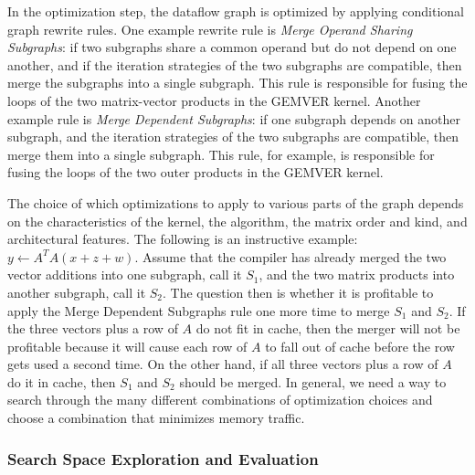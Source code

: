 \documentclass[11pt]{article}
\begin{document}
In the optimization step, the dataflow graph is optimized by applying conditional graph rewrite rules.  One example rewrite rule is \emph{Merge Operand Sharing Subgraphs}: if two subgraphs share a common operand but do not depend on one another, and if the iteration strategies of the two subgraphs are compatible, then merge the subgraphs into a single subgraph.  This rule is responsible for fusing the loops of the two matrix-vector products in the GEMVER kernel.  Another example rule is \emph{Merge Dependent Subgraphs}: if one subgraph depends on another subgraph, and the iteration strategies of the two subgraphs are compatible, then merge them into a single subgraph.  This rule, for example, is responsible for fusing the loops of the two outer products in the GEMVER kernel.

The choice of which optimizations to apply to various parts of the graph depends on the characteristics of the kernel, the algorithm, the matrix order and kind, and architectural features.  The following is an instructive example: $y \gets A^T A (x + z + w)$.  Assume that the compiler has already merged the two vector additions into one subgraph, call it $S_1$, and the two matrix products into another subgraph, call it $S_2$. The question then is whether it is profitable to apply the Merge Dependent Subgraphs rule one more time to merge $S_1$ and $S_2$. If the three vectors plus a row of $A$ do not fit in cache, then the merger will not be profitable because it will cause each row of $A$ to fall out of cache before the row gets used a second time.  On the other hand, if all three vectors plus a row of $A$ do it in cache, then $S_1$ and $S_2$ should be merged.  In general, we need a way to search through the many different combinations of optimization choices and choose a combination that minimizes memory traffic.

\subsubsection{Search Space Exploration and Evaluation}
\label{sec:search}
\end{document}
